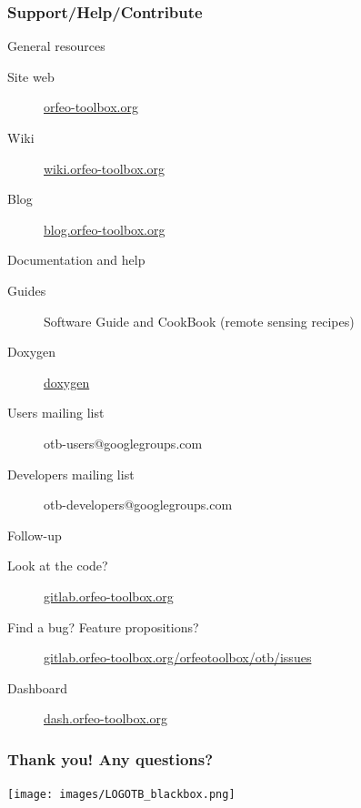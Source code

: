 \documentclass[8pt]{beamer}
\begin{document}
\begin{frame}
\frametitle{Support/Help/Contribute}
\vspace{-0.2cm}
\begin{block}{General resources}
\vspace{-0.2cm}
\begin{description}
\item[Site web] \href{http://www.orfeo-toolbox.org}{orfeo-toolbox.org}
\item[Wiki] \href{http://wiki.orfeo-toolbox.org}{wiki.orfeo-toolbox.org}
\item[Blog] \href{http://blog.orfeo-toolbox.org}{blog.orfeo-toolbox.org}
\end{description}
\end{block}
\vspace{-0.2cm}
\begin{block}{Documentation and help}
\vspace{-0.2cm}
\begin{description}
\item[Guides] Software Guide and CookBook (remote sensing recipes)
\item[Doxygen] \href{http://www.orfeo-toolbox.org/doxygen}{doxygen}
\item[Users mailing list] otb-users@googlegroups.com
\item[Developers mailing list] otb-developers@googlegroups.com
\end{description}
\end{block}
\vspace{-0.2cm}
\begin{block}{Follow-up}
\vspace{-0.2cm}
\begin{description}
\item[Look at the code?] \href{https://gitlab.orfeo-toolbox.org}{gitlab.orfeo-toolbox.org}
\item[Find a bug? Feature propositions?] \href{https://gitlab.orfeo-toolbox.org/orfeotoolbox/otb/issues}{gitlab.orfeo-toolbox.org/orfeotoolbox/otb/issues}
\item[Dashboard] \href{http://dash.orfeo-toolbox.org}{dash.orfeo-toolbox.org}
\end{description}
\end{block}
\end{frame}


\begin{frame}
\frametitle{Thank you! Any questions?}
\begin{minipage}[t][6cm][t]{\textwidth}
\begin{center}
\texttt{[image: images/LOGOTB\_blackbox.png]}
\end{center}
\end{minipage}
\end{frame}
\end{document}
